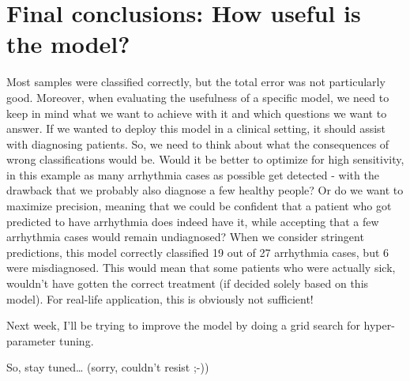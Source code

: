 \documentclass[]{book}
\begin{document}
\hypertarget{final-conclusions-how-useful-is-the-model}{%
\section{Final conclusions: How useful is the model?}\label{final-conclusions-how-useful-is-the-model}}

Most samples were classified correctly, but the total error was not particularly good. Moreover, when evaluating the usefulness of a specific model, we need to keep in mind what we want to achieve with it and which questions we want to answer. If we wanted to deploy this model in a clinical setting, it should assist with diagnosing patients. So, we need to think about what the consequences of wrong classifications would be. Would it be better to optimize for high sensitivity, in this example as many arrhythmia cases as possible get detected - with the drawback that we probably also diagnose a few healthy people? Or do we want to maximize precision, meaning that we could be confident that a patient who got predicted to have arrhythmia does indeed have it, while accepting that a few arrhythmia cases would remain undiagnosed? When we consider stringent predictions, this model correctly classified 19 out of 27 arrhythmia cases, but 6 were misdiagnosed. This would mean that some patients who were actually sick, wouldn't have gotten the correct treatment (if decided solely based on this model). For real-life application, this is obviously not sufficient!

Next week, I'll be trying to improve the model by doing a grid search for hyper-parameter tuning.

So, stay tuned\ldots{} (sorry, couldn't resist ;-))
\end{document}
